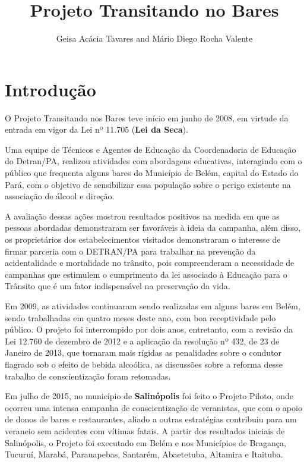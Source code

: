 \documentclass[output=paper,colorlinks,citecolor=green]{langscibook}
\author{Geisa Acácia Tavares\orcid{}\affiliation{Analista de Trânsito: Pedagoga} and Mário Diego Rocha Valente\orcid{}\affiliation{Analista de Trânsito: Estatístico}}
\title{Projeto Transitando no Bares}
\begin{document}
\maketitle


\section{Introdução}
O Projeto Transitando nos Bares teve início em junho de 2008, em virtude da entrada em vigor da Lei nº 11.705 (\textbf{Lei da Seca}).\vskip0.3cm

Uma equipe de Técnicos e Agentes de Educação da Coordenadoria de Educação do Detran/PA, realizou atividades com abordagens educativas, interagindo com o público que frequenta alguns bares do Município de Belém, capital do Estado do Pará, com o objetivo de sensibilizar essa população sobre o perigo existente na associação de álcool e direção. \vskip0.3cm

A avaliação dessas ações mostrou resultados positivos na medida em que as pessoas abordadas demonstraram ser favoráveis à ideia da campanha, além disso, os proprietários dos estabelecimentos visitados demonstraram o interesse de firmar parceria com o DETRAN/PA para trabalhar na prevenção da acidentalidade e mortalidade no trânsito, pois compreenderam a necessidade de campanhas que estimulem o cumprimento da lei associado à Educação para o Trânsito que é um fator indispensável na preservação da vida.\vskip0.3cm

Em 2009, as atividades continuaram sendo realizadas em alguns bares em Belém, sendo trabalhadas em quatro meses deste ano, com boa receptividade pelo público. O projeto foi interrompido por dois anos, entretanto, com a revisão da Lei 12.760 de dezembro de 2012 e a aplicação da resolução nº 432, de 23 de Janeiro de 2013, que tornaram mais rígidas as penalidades sobre o condutor flagrado sob o efeito de bebida alcoólica, as discussões sobre a reforma desse trabalho de conscientização foram retomadas.\vskip0.3cm

Em julho de 2015, no município de \textbf{Salinópolis} foi feito o Projeto Piloto, onde ocorreu uma intensa campanha de conscientização de veranistas, que com o apoio de donos de bares e restaurantes, aliado a outras estratégias contribuiu para um veraneio sem acidentes com vítimas fatais. A partir dos resultados iniciais de Salinópolis, o Projeto foi executado em Belém e nos Municípios de Bragança, Tucuruí, Marabá, Parauapebas, Santarém, Abaetetuba, Altamira e Itaituba.\vskip0.3cm
\end{document}
